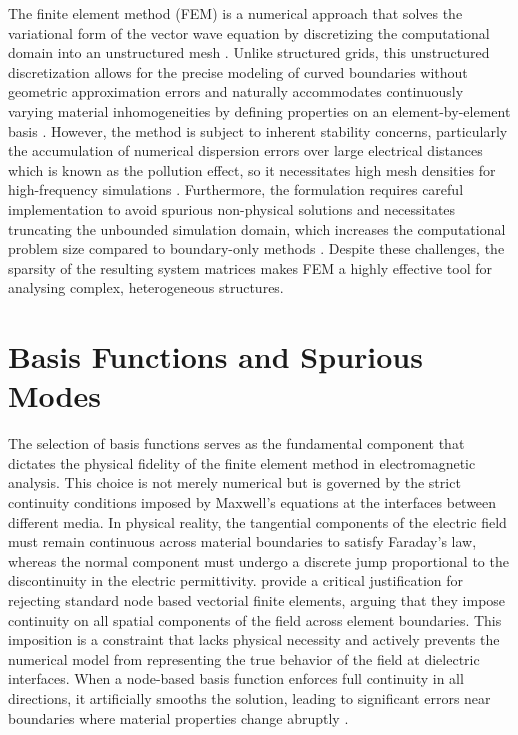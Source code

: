 \documentclass[class=report, crop=false]{standalone}
\begin{document}
The finite element method (FEM) is a numerical approach that solves the variational form of the vector wave equation by discretizing the computational domain into an unstructured mesh \citep{Jin2015}. Unlike structured grids, this unstructured discretization allows for the precise modeling of curved boundaries without geometric approximation errors and naturally accommodates continuously varying material inhomogeneities by defining properties on an element-by-element basis \citep{Paulsen1994}. However, the method is subject to inherent stability concerns, particularly the accumulation of numerical dispersion errors over large electrical distances which is known as the pollution effect, so it necessitates high mesh densities for high-frequency simulations \citep{Babuska1997}. Furthermore, the formulation requires careful implementation to avoid spurious non-physical solutions and necessitates truncating the unbounded simulation domain, which increases the computational problem size compared to boundary-only methods \citep{Jin2015}. Despite these challenges, the sparsity of the resulting system matrices makes FEM a highly effective tool for analysing complex, heterogeneous structures.

\section{Basis Functions and Spurious Modes}

The selection of basis functions serves as the fundamental component that dictates the physical fidelity of the finite element method in electromagnetic analysis. This choice is not merely numerical but is governed by the strict continuity conditions imposed by Maxwell's equations at the interfaces between different media. In physical reality, the tangential components of the electric field must remain continuous across material boundaries to satisfy Faraday's law, whereas the normal component must undergo a discrete jump proportional to the discontinuity in the electric permittivity. \citet{Bossavit1989} provide a critical justification for rejecting standard node based vectorial finite elements, arguing that they impose continuity on all spatial components of the field across element boundaries. This imposition is a constraint that lacks physical necessity and actively prevents the numerical model from representing the true behavior of the field at dielectric interfaces. When a node-based basis function enforces full continuity in all directions, it artificially smooths the solution, leading to significant errors near boundaries where material properties change abruptly \citep{Bossavit1989}.
\end{document}

